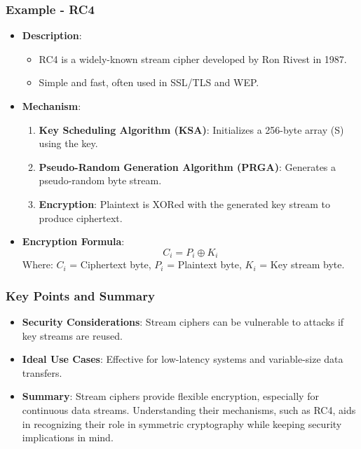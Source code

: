 \documentclass{beamer}
\begin{document}
\begin{frame}[fragile]
    \frametitle{Example - RC4}
    \begin{itemize}
        \item \textbf{Description}: 
        \begin{itemize}
            \item RC4 is a widely-known stream cipher developed by Ron Rivest in 1987.
            \item Simple and fast, often used in SSL/TLS and WEP.
        \end{itemize}
        
        \item \textbf{Mechanism}:
        \begin{enumerate}
            \item \textbf{Key Scheduling Algorithm (KSA)}: Initializes a 256-byte array (S) using the key.
            \item \textbf{Pseudo-Random Generation Algorithm (PRGA)}: Generates a pseudo-random byte stream.
            \item \textbf{Encryption}: Plaintext is XORed with the generated key stream to produce ciphertext.
        \end{enumerate}
        
        \item \textbf{Encryption Formula}:
        \begin{equation}
        C_i = P_i \oplus K_i
        \end{equation}
        Where:  
        \( C_i \) = Ciphertext byte,  
        \( P_i \) = Plaintext byte,  
        \( K_i \) = Key stream byte.
    \end{itemize}
\end{frame}

\begin{frame}[fragile]
    \frametitle{Key Points and Summary}
    \begin{itemize}
        \item \textbf{Security Considerations}: Stream ciphers can be vulnerable to attacks if key streams are reused.
        
        \item \textbf{Ideal Use Cases}: Effective for low-latency systems and variable-size data transfers.
        
        \item \textbf{Summary}: Stream ciphers provide flexible encryption, especially for continuous data streams. Understanding their mechanisms, such as RC4, aids in recognizing their role in symmetric cryptography while keeping security implications in mind.
    \end{itemize}
\end{frame}
\end{document}
